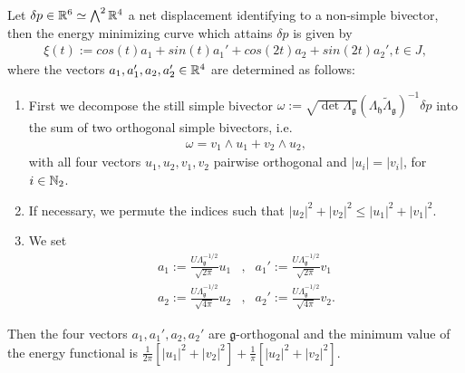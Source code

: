 \begin{theorem}
Let $\delta p \in \mathbb{R}^6 \simeq \bigwedge^2 \mathbb{R}^4$ a net displacement identifying to a non-simple bivector, then the energy minimizing curve which attains $\delta p$ is given by
\begin{align}
\xi(t) := cos(t) a_1 + sin(t) a_1' + cos(2t) a_2 + sin(2t) a_2', t \in J,
\end{align}
where the vectors $a_1, a_1',a_2, a_2' \in \mathbb{R}^4$ are determined as follows:
\begin{enumerate}
\item First we decompose the still simple bivector $\omega := \sqrt{\det \Lambda_{\mathfrak{g}}}(\Lambda_{\mathfrak{h}} \tilde{\Lambda}_{\mathfrak{g}})^{-1} \delta p$ into the sum of two orthogonal simple bivectors, i.e.
\begin{align}
	\omega = v_1 \wedge u_1 + v_2 \wedge u_2,
\end{align}
with  all four vectors $u_1, u_2, v_1, v_2$ pairwise orthogonal and  $|u_i| = |v_i|$, for $i \in \mathbb{N}_2$.

\item If necessary, we permute the indices such that $|u_2|^2 + |v_2|^2 \leq |u_1|^2 + |v_1|^2$.

\item We set
	\begin{align}
		a_1 := \frac{U \Lambda_{\mathfrak{g}}^{-1/2}}{\sqrt{2 \pi}} u_1 &, & a_1' := \frac{U \Lambda_{\mathfrak{g}}^{-1/2}}{\sqrt{2 \pi}}v_1\\
	a_2 := \frac{U \Lambda_{\mathfrak{g}}^{-1/2}}{\sqrt{4 \pi}} u_2& , & a_2' := \frac{U \Lambda_{\mathfrak{g}}^{-1/2}}{\sqrt{4 \pi}} v_2.	
	\end{align}
\end{enumerate}
Then the four vectors $a_1, a_1', a_2, a_2'$ are $\mathfrak{g}$-orthogonal and the minimum value of the energy functional is $\frac{1}{2 \pi} [|u_1|^2 + |v_2|^2] + \frac{1}{ \pi} [|u_2|^2 + |v_2|^2]$.
\end{theorem} 




